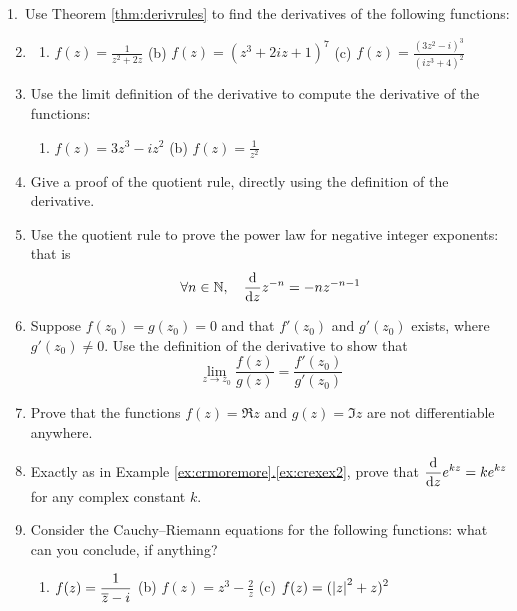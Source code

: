 \begin{exercises*}{}
\hangindent\leftmargini
\textup{1.}\ Use Theorem \ref{thm:derivrules} to find the derivatives of the following functions:
\begin{enumerate}\setcounter{enumi}{1}
  \item[]\begin{enumerate}
  	\item $\displaystyle f(z)=\frac 1{z^2+2z}$\qquad
    (b) $\displaystyle f(z)=(z^3+2iz+1)^7$\qquad
    (c) $\displaystyle f(z)=\frac{(3z^2-i)^3}{(iz^3+4)^2}$
  \end{enumerate}
  
  \item Use the limit definition of the derivative to compute the derivative of the functions:
  \begin{enumerate}
  	\item $\displaystyle f(z)=3z^3-iz^2$\qquad
    (b) $\displaystyle f(z)=\frac 1{z^2}$
  \end{enumerate}
  
  \item Give a proof of the quotient rule, directly using the definition of the derivative.
  
  \item Use the quotient rule to prove the power law for negative integer exponents: that is
  \[\forall n\in\mathbb{N},\quad \frac{\mathrm{d} }{\mathrm{d} z}z^{-n}=-nz^{-n-1}\]
  
  \item Suppose $f(z_0)=g(z_0)=0$ and that $f'(z_0)$ and $g'(z_0)$ exists, where $g'(z_0)\neq 0$. Use the definition of the derivative to show that
  \[\lim_{z\to z_0}\frac{f(z)}{g(z)}=\frac{f'(z_0)}{g'(z_0)}\]
  
  \item Prove that the functions $f(z)=\Re z$ and $g(z)=\Im z$ are not differentiable anywhere.
  
  \item Exactly as in Example \hyperref[ex:crexex2]{\ref*{ex:crmoremore}.\ref*{ex:crexex2}}, prove that $\displaystyle \frac{\mathrm{d} }{\mathrm{d} z}e^{kz} =ke^{kz}$ for any complex constant $k$.
  
  \item Consider the Cauchy--Riemann equations for the following functions: what can you conclude, if anything?
  \begin{enumerate}
  	\item $\displaystyle f(z)= \frac{1}{\overline{z}-i}$\qquad
    (b) $\displaystyle f(z)=z^3-\frac 2z$\qquad
    (c) $\displaystyle f(z)=(\left| z\right|^2+z)^2$
  \end{enumerate}
  

\end{enumerate}
\end{exercises*}
